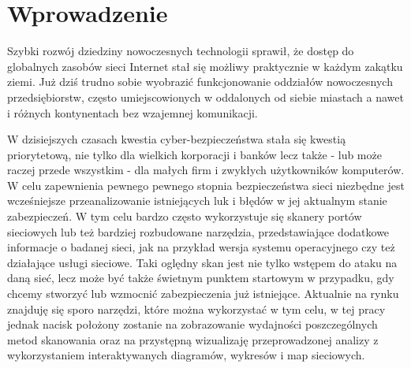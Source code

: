 \chapter{Wprowadzenie}
\label{cha:wprowadzenie}

Szybki rozwój dziedziny nowoczesnych technologii sprawił, że dostęp do
globalnych zasobów sieci Internet stał się możliwy praktycznie w każdym zakątku
ziemi. Już dziś trudno sobie wyobrazić funkcjonowanie oddziałów nowoczesnych
przedsiębiorstw, często umiejscowionych w oddalonych od siebie miastach a nawet i
różnych kontynentach bez wzajemnej komunikacji.

W dzisiejszych czasach kwestia cyber-bezpieczeństwa stała się kwestią priorytetową, nie tylko dla wielkich korporacji i banków lecz także - lub może raczej przede wszystkim - dla małych firm i zwykłych użytkowników komputerów. W celu zapewnienia pewnego pewnego stopnia bezpieczeństwa sieci niezbędne jest wcześniejsze przeanalizowanie istniejących luk i błędów w jej aktualnym stanie zabezpieczeń. W tym celu bardzo często wykorzystuje się skanery portów sieciowych lub też bardziej rozbudowane narzędzia, przedstawiające dodatkowe informacje o badanej sieci, jak na przykład wersja systemu operacyjnego czy też działające usługi sieciowe. Taki oględny skan jest nie tylko wstępem do ataku na daną sieć, lecz może być także świetnym punktem startowym w przypadku, gdy chcemy stworzyć lub wzmocnić zabezpieczenia już istniejące. Aktualnie na rynku znajduję się sporo narzędzi, które można wykorzystać w tym celu, w tej pracy jednak nacisk położony zostanie na zobrazowanie wydajności poszczególnych metod skanowania oraz na przystępną wizualizaję przeprowadzonej analizy z wykorzystaniem interaktywanych diagramów, wykresów i map sieciowych.





